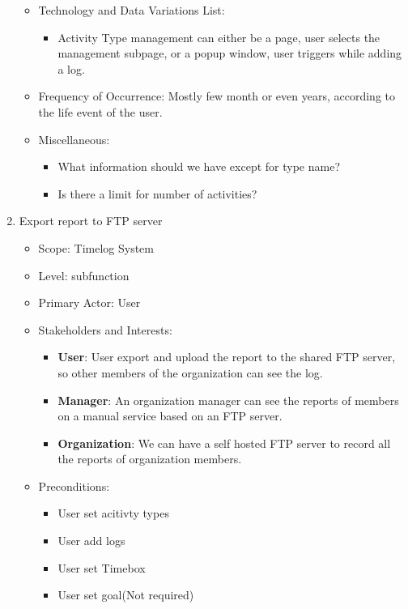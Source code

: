 \documentclass[12pt, a4paper]{article}
\begin{document}
\begin{CJK*}{UTF8}{bkai}
\begin{enumerate}
\begin{itemize}
          \item Technology and Data Variations List:
            \begin{itemize}
              \item Activity Type management can either be a page, user selects the management subpage, or a popup window, user triggers while adding a log.
            \end{itemize}
          \item Frequency of Occurrence: Mostly few month or even years, according to the life event of the user.
          \item Miscellaneous:
            \begin{itemize}
              \item What information should we have except for type name?
              \item Is there a limit for number of activities?
            \end{itemize}
        \end{itemize}
      \item Export report to FTP server
        \begin{itemize}
          \item Scope: Timelog System
          \item Level: subfunction
          \item Primary Actor: User
          \item Stakeholders and Interests:
            \begin{itemize}
              \item {\bf User}: User export and upload the report to the shared FTP server, so other members of the organization can see the log.
              \item {\bf Manager}: An organization manager can see the reports of members on a manual service based on an FTP server.
              \item {\bf Organization}: We can have a self hosted FTP server to record all the reports of organization members.
            \end{itemize}
          \item Preconditions:
            \begin{itemize}
              \item User set acitivty types
              \item User add logs
              \item User set Timebox
              \item User set goal(Not required)

\end{itemize}
\end{itemize}
\end{enumerate}
\end{CJK*}
\end{document}
